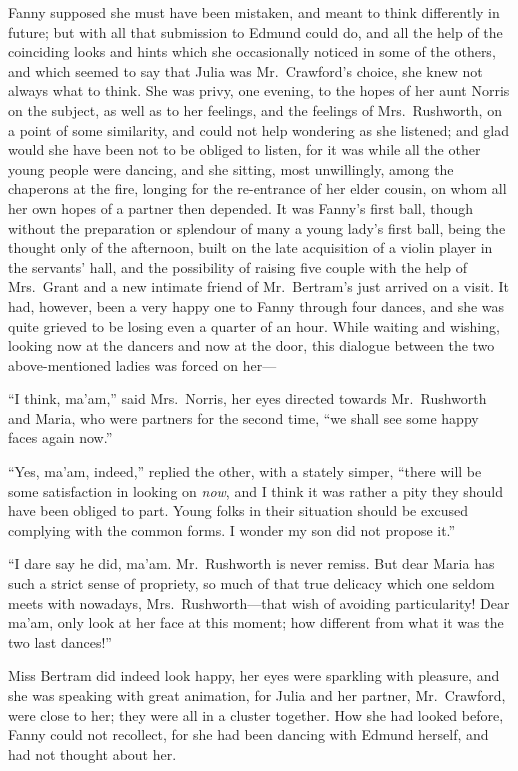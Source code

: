 \documentclass{article}
\begin{document}
Fanny supposed she must have been mistaken, and meant to
think differently in future; but with all that submission
to Edmund could do, and all the help of the coinciding
looks and hints which she occasionally noticed in some
of the others, and which seemed to say that Julia was
Mr.\ Crawford's choice, she knew not always what to think.
She was privy, one evening, to the hopes of her aunt
Norris on the subject, as well as to her feelings,
and the feelings of Mrs.\ Rushworth, on a point of some
similarity, and could not help wondering as she listened;
and glad would she have been not to be obliged to listen,
for it was while all the other young people were dancing,
and she sitting, most unwillingly, among the chaperons at
the fire, longing for the re-entrance of her elder cousin,
on whom all her own hopes of a partner then depended.
It was Fanny's first ball, though without the preparation
or splendour of many a young lady's first ball, being the
thought only of the afternoon, built on the late acquisition
of a violin player in the servants' hall, and the possibility
of raising five couple with the help of Mrs.\ Grant and a new
intimate friend of Mr.\ Bertram's just arrived on a visit.
It had, however, been a very happy one to Fanny through
four dances, and she was quite grieved to be losing
even a quarter of an hour.  While waiting and wishing,
looking now at the dancers and now at the door, this dialogue
between the two above-mentioned ladies was forced on her---%

``I think, ma'am,'' said Mrs.\ Norris, her eyes directed
towards Mr.\ Rushworth and Maria, who were partners for
the second time, ``we shall see some happy faces again now.''

``Yes, ma'am, indeed,'' replied the other, with a stately simper,
``there will be some satisfaction in looking on \emph{now},
and I think it was rather a pity they should have been
obliged to part.  Young folks in their situation
should be excused complying with the common forms.
I wonder my son did not propose it.''

``I dare say he did, ma'am. Mr.\ Rushworth is never remiss.
But dear Maria has such a strict sense of propriety, so much
of that true delicacy which one seldom meets with nowadays,
Mrs.\ Rushworth---that wish of avoiding particularity!
Dear ma'am, only look at her face at this moment;
how different from what it was the two last dances!''

Miss Bertram did indeed look happy, her eyes were
sparkling with pleasure, and she was speaking with
great animation, for Julia and her partner, Mr.\ Crawford,
were close to her; they were all in a cluster together.
How she had looked before, Fanny could not recollect,
for she had been dancing with Edmund herself, and had
not thought about her.
\end{document}
